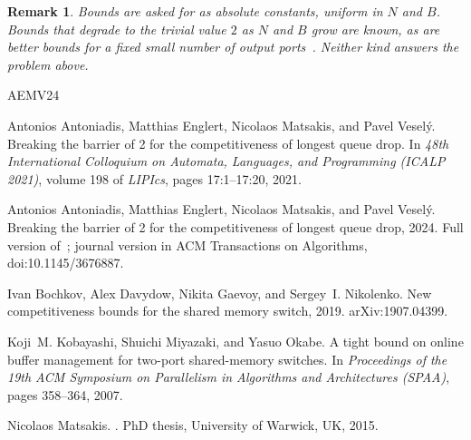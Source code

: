 \documentclass[10pt]{article}
\newtheorem{remark}[theorem]{Remark}
\begin{document}
\begin{remark}\label{rem:uniform}
Bounds are asked for as absolute constants, uniform in $N$ and $B$. Bounds that
degrade to the trivial value $2$ as $N$ and $B$ grow are known, as are better
bounds for a fixed small number of output ports~\cite{KMO07,Matsakis15}.
Neither kind answers the problem above.
\end{remark}

\begin{thebibliography}{AEMV24}

Antonios Antoniadis, Matthias Englert, Nicolaos Matsakis, and Pavel Vesel{\'y}.
\newblock Breaking the barrier of 2 for the competitiveness of longest queue
  drop.
\newblock In {\em 48th International Colloquium on Automata, Languages, and
  Programming (ICALP 2021)}, volume 198 of {\em LIPIcs}, pages 17:1--17:20,
  2021.

Antonios Antoniadis, Matthias Englert, Nicolaos Matsakis, and Pavel Vesel{\'y}.
\newblock Breaking the barrier of 2 for the competitiveness of longest queue
  drop, 2024.
\newblock Full version of~\cite{AEMV21}; journal version in ACM Transactions on
  Algorithms, doi:10.1145/3676887.

Ivan Bochkov, Alex Davydow, Nikita Gaevoy, and Sergey~I. Nikolenko.
\newblock New competitiveness bounds for the shared memory switch, 2019.
\newblock arXiv:1907.04399.

Koji~M. Kobayashi, Shuichi Miyazaki, and Yasuo Okabe.
\newblock A tight bound on online buffer management for two-port shared-memory
  switches.
\newblock In {\em Proceedings of the 19th ACM Symposium on Parallelism in
  Algorithms and Architectures (SPAA)}, pages 358--364, 2007.

Nicolaos Matsakis.
.
\newblock PhD thesis, University of Warwick, UK, 2015.

\end{thebibliography}
\end{document}
